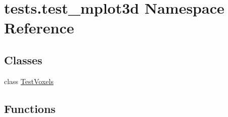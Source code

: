 \hypertarget{namespacetests_1_1test__mplot3d}{}\section{tests.\+test\+\_\+mplot3d Namespace Reference}
\label{namespacetests_1_1test__mplot3d}
\subsection*{Classes}
\begin{DoxyCompactItemize}
\item 
class \hyperlink{classtests_1_1test__mplot3d_1_1TestVoxels}{Test\+Voxels}
\end{DoxyCompactItemize}
\subsection*{Functions}
